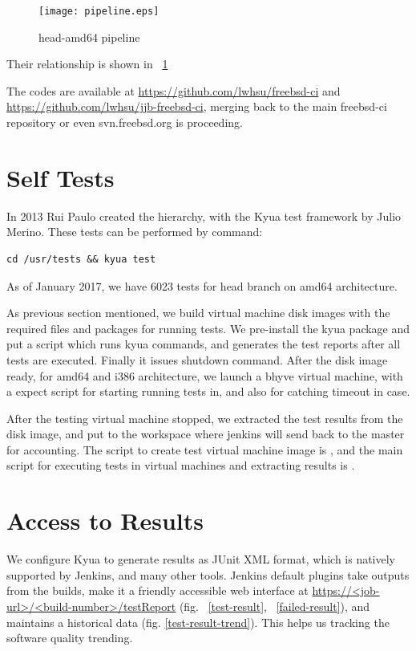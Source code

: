 \documentclass[a4paper,twocolumn,10pt]{article}
\begin{document}
\begin{figure}
\texttt{[image: pipeline.eps]}
\caption{head-amd64 pipeline}
\label{pipeline}
\end{figure}

Their relationship is shown in ~\ref{pipeline}

The codes are available at \url{https://github.com/lwhsu/freebsd-ci} and
\url{https://github.com/lwhsu/jjb-freebsd-ci}, merging back to the main
freebsd-ci repository or even svn.freebsd.org is proceeding.

\section{Self Tests}

In 2013 Rui Paulo created the  hierarchy, with the Kyua test
framework by Julio Merino. These tests can be performed by command:
\begin{lstlisting}
cd /usr/tests && kyua test
\end{lstlisting}
As of January 2017, we have 6023 tests for head branch on amd64 architecture.

As previous section mentioned, we build virtual machine disk images with the
required files and packages for running tests. We pre-install the kyua package
and put a script which runs kyua commands, and generates the test reports after
all tests are executed. Finally it issues shutdown command. After the disk
image ready, for amd64 and i386 architecture, we launch a bhyve virtual
machine, with a expect script for starting running tests in, and also for
catching timeout in case.

After the testing virtual machine stopped, we extracted the test results from
the disk image, and put to the workspace where jenkins will send back to the
master for accounting. The script to create test virtual machine image is
, and the main script for executing
tests in virtual machines and extracting results is
.

\section{Access to Results}

We configure Kyua to generate results as JUnit XML format, which is natively
supported by Jenkins, and many other tools. Jenkins default plugins take
outputs from the builds, make it a friendly accessible web interface at
\url{https://<job-url>/<build-number>/testReport} (fig. ~\ref{test-result},
~\ref{failed-result}), and maintains a historical data (fig.
\ref{test-result-trend}). This helps us tracking the software quality trending.
\end{document}
